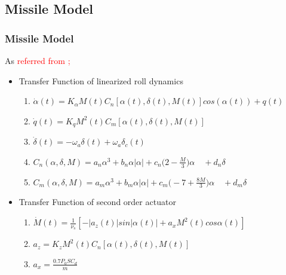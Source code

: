 \documentclass[table,10pt,red]{beamer}	%
\begin{document}
\subsection{Missile Model}
	\begin{frame}
	\frametitle{Missile Model}
	As \textcolor{red}{referred from \cite{};}
 	\begin{itemize}  %
		\item Transfer Function of linearized roll dynamics
		\begin{enumerate}
				\item $\dot{\alpha}(t)=	K_\alpha M(t) C_n [\alpha(t),\delta(t),M(t)]cos(\alpha(t)) + q(t) $
				\item $\dot{q}(t) =	K_q M^2(t) C_m [\alpha(t),\delta(t),M(t)]$
				\item $\dot{\delta}(t)	=	-\omega_a\delta(t) + \omega_a\delta_c(t)$
				\item $C_n(\alpha,\delta,M)=a_n\alpha^3+b_n\alpha|\alpha|+c_n\Big(2-\frac{M}{3}\Big)\alpha\quad+ d_n\delta$
				\item $C_m(\alpha,\delta,M)=a_m\alpha^3+b_m\alpha|\alpha|+ c_m\Big(-7+\frac{8M}{3}\Big)\alpha 
				\quad+d_m\delta$
 		\end{enumerate}
		\end{itemize}
	\begin{itemize}
		\item  Transfer Function of second order actuator
			\begin{enumerate}
			 \item $\dot{M}(t)=\frac{1}{\nu_s}[-|a_z(t)|sin|\alpha(t)|+a_xM^2(t)cos\alpha(t)]$
			 \item $a_z = K_z M^2(t)C_n[\alpha(t),\delta(t),M(t)]$
			 \item $a_x = \frac{0.7P_0SC_d}{m}$
			\end{enumerate}
	\end{itemize}

	\end{frame}
 	
\end{document}
